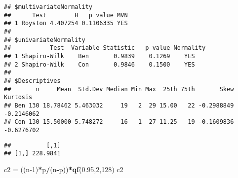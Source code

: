 \documentclass[
]{article}
\newenvironment{Shaded}{\begin{snugshade}}{\end{snugshade}}
\newcommand{\CommentTok}[1]{\textcolor[rgb]{0.56,0.35,0.01}{\textit{#1}}}
\newcommand{\DecValTok}[1]{\textcolor[rgb]{0.00,0.00,0.81}{#1}}
\newcommand{\FloatTok}[1]{\textcolor[rgb]{0.00,0.00,0.81}{#1}}
\newcommand{\KeywordTok}[1]{\textcolor[rgb]{0.13,0.29,0.53}{\textbf{#1}}}
\newcommand{\NormalTok}[1]{#1}
\newcommand{\OperatorTok}[1]{\textcolor[rgb]{0.81,0.36,0.00}{\textbf{#1}}}
\newcommand{\StringTok}[1]{\textcolor[rgb]{0.31,0.60,0.02}{#1}}
\begin{document}
\begin{verbatim}
## $multivariateNormality
##      Test        H   p value MVN
## 1 Royston 4.407254 0.1106335 YES
## 
## $univariateNormality
##           Test  Variable Statistic   p value Normality
## 1 Shapiro-Wilk    Ben       0.9839    0.1269    YES   
## 2 Shapiro-Wilk    Con       0.9846    0.1500    YES   
## 
## $Descriptives
##       n     Mean  Std.Dev Median Min Max  25th 75th       Skew   Kurtosis
## Ben 130 18.78462 5.463032     19   2  29 15.00   22 -0.2988849 -0.2146062
## Con 130 15.50000 5.748272     16   1  27 11.25   19 -0.1609836 -0.6276702
\end{verbatim}

\begin{Shaded}
\end{Shaded}

\begin{verbatim}
##          [,1]
## [1,] 228.9841
\end{verbatim}

\begin{Shaded}
\begin{Highlighting}[]
\NormalTok{c2 =}\StringTok{  }\NormalTok{((n}\DecValTok{-1}\NormalTok{)}\OperatorTok{*}\NormalTok{p}\OperatorTok{/}\NormalTok{(n}\OperatorTok{-}\NormalTok{p))}\OperatorTok{*}\KeywordTok{qf}\NormalTok{(}\FloatTok{0.95}\NormalTok{,}\DecValTok{2}\NormalTok{,}\DecValTok{128}\NormalTok{)}
\NormalTok{c2}
\end{Highlighting}
\end{Shaded}
\end{document}
